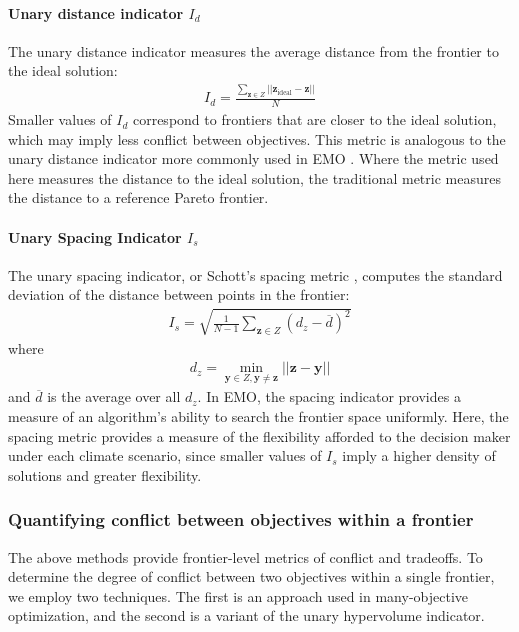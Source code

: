 \paragraph{Unary distance indicator $I_d$} The unary distance indicator measures the average distance from the frontier to the ideal solution:
\begin{align}
I_d = \frac{\sum_{\mathbf{z} \in Z} ||\mathbf{z}_{\text{ideal}} - \mathbf{z} ||}{N}
\end{align}
Smaller values of $I_d$ correspond to frontiers that are closer to the ideal solution, which may imply less conflict between objectives. This metric is analogous to the unary distance indicator more commonly used in EMO \cite{czyzzak1998pareto}. Where the metric used here measures the distance to the ideal solution, the traditional metric measures the distance to a reference Pareto frontier.

\paragraph{Unary Spacing Indicator $I_s$} The unary spacing indicator, or Schott's spacing metric \cite{schott1995fault}, computes the standard deviation of the distance between points in the frontier:
\begin{align}
I_s = \sqrt{\frac{1}{N-1} \sum_{\mathbf{z} \in Z} (d_z - \overbar{d})^2}
\end{align}
where
\begin{align}
d_z = \min_{\mathbf{y} \in Z, \mathbf{y} \neq \mathbf{z}} ||\mathbf{z} - \mathbf{y}||
\end{align}
and $\overbar{d}$ is the average over all $d_z$. In EMO, the spacing indicator provides a measure of an algorithm's ability to search the frontier space uniformly. Here, the spacing metric provides a measure of the flexibility afforded to the decision maker under each climate scenario, since smaller values of $I_s$ imply a higher density of solutions and greater flexibility.

\subsubsection{Quantifying conflict between objectives within a frontier}

The above methods provide frontier-level metrics of conflict and tradeoffs. To determine the degree of conflict between two objectives within a single frontier, we employ two techniques. The first is an approach used in many-objective optimization, and the second is a variant of the unary hypervolume indicator.

